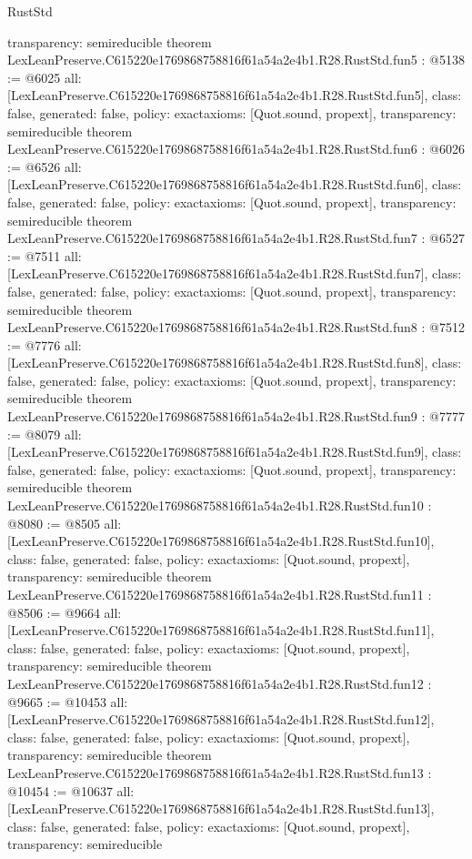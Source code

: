 \begin{lexlean}{RustStd}
\begin{coremodule}
{  transparency: semireducible
}
theorem LexLeanPreserve.C615220e1769868758816f61a54a2e4b1.R28.RustStd.fun5 : @5138 := @6025 {
  all: [LexLeanPreserve.C615220e1769868758816f61a54a2e4b1.R28.RustStd.fun5],
  class: false,
  generated: false,
  policy: exact{axioms: [Quot.sound, propext]},
  transparency: semireducible
}
theorem LexLeanPreserve.C615220e1769868758816f61a54a2e4b1.R28.RustStd.fun6 : @6026 := @6526 {
  all: [LexLeanPreserve.C615220e1769868758816f61a54a2e4b1.R28.RustStd.fun6],
  class: false,
  generated: false,
  policy: exact{axioms: [Quot.sound, propext]},
  transparency: semireducible
}
theorem LexLeanPreserve.C615220e1769868758816f61a54a2e4b1.R28.RustStd.fun7 : @6527 := @7511 {
  all: [LexLeanPreserve.C615220e1769868758816f61a54a2e4b1.R28.RustStd.fun7],
  class: false,
  generated: false,
  policy: exact{axioms: [Quot.sound, propext]},
  transparency: semireducible
}
theorem LexLeanPreserve.C615220e1769868758816f61a54a2e4b1.R28.RustStd.fun8 : @7512 := @7776 {
  all: [LexLeanPreserve.C615220e1769868758816f61a54a2e4b1.R28.RustStd.fun8],
  class: false,
  generated: false,
  policy: exact{axioms: [Quot.sound, propext]},
  transparency: semireducible
}
theorem LexLeanPreserve.C615220e1769868758816f61a54a2e4b1.R28.RustStd.fun9 : @7777 := @8079 {
  all: [LexLeanPreserve.C615220e1769868758816f61a54a2e4b1.R28.RustStd.fun9],
  class: false,
  generated: false,
  policy: exact{axioms: [Quot.sound, propext]},
  transparency: semireducible
}
theorem LexLeanPreserve.C615220e1769868758816f61a54a2e4b1.R28.RustStd.fun10 : @8080 := @8505 {
  all: [LexLeanPreserve.C615220e1769868758816f61a54a2e4b1.R28.RustStd.fun10],
  class: false,
  generated: false,
  policy: exact{axioms: [Quot.sound, propext]},
  transparency: semireducible
}
theorem LexLeanPreserve.C615220e1769868758816f61a54a2e4b1.R28.RustStd.fun11 : @8506 := @9664 {
  all: [LexLeanPreserve.C615220e1769868758816f61a54a2e4b1.R28.RustStd.fun11],
  class: false,
  generated: false,
  policy: exact{axioms: [Quot.sound, propext]},
  transparency: semireducible
}
theorem LexLeanPreserve.C615220e1769868758816f61a54a2e4b1.R28.RustStd.fun12 : @9665 := @10453 {
  all: [LexLeanPreserve.C615220e1769868758816f61a54a2e4b1.R28.RustStd.fun12],
  class: false,
  generated: false,
  policy: exact{axioms: [Quot.sound, propext]},
  transparency: semireducible
}
theorem LexLeanPreserve.C615220e1769868758816f61a54a2e4b1.R28.RustStd.fun13 : @10454 := @10637 {
  all: [LexLeanPreserve.C615220e1769868758816f61a54a2e4b1.R28.RustStd.fun13],
  class: false,
  generated: false,
  policy: exact{axioms: [Quot.sound, propext]},
  transparency: semireducible
}
\end{coremodule}
\end{lexlean}
